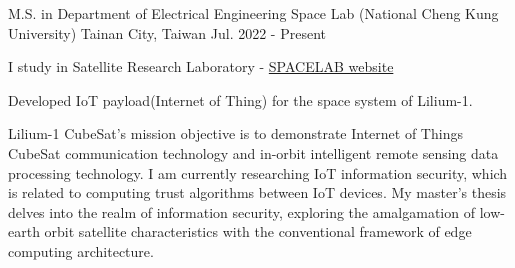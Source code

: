 

\begin{cventries}

  \cventry
    {M.S. in Department of Electrical Engineering}
    {Space Lab (National Cheng Kung University)}
    {Tainan City, Taiwan} %
    {Jul. 2022 - Present} %
    {
      \begin{cvitems} %
      \item {I study in Satellite Research Laboratory - \href{http://satellite.ncku.edu.tw/}{SPACELAB website}}
      \item {Developed IoT payload(Internet of Thing) for the space system of Lilium-1.}
      \newline
      \end{cvitems}
    }


\end{cventries}

\begin{cvparagraph}

Lilium-1 CubeSat’s mission objective is to demonstrate Internet of Things CubeSat communication technology and in-orbit intelligent remote sensing data processing technology. I am currently researching IoT information security, which is related to computing trust algorithms between IoT devices. My master's thesis delves into the realm of information security, exploring the amalgamation of low-earth orbit satellite characteristics with the conventional framework of edge computing architecture.
\end{cvparagraph}
